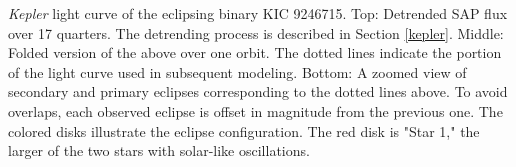 \label{fig:keplerfig} \emph{Kepler} light curve of the eclipsing binary KIC 9246715. Top: Detrended SAP flux over 17 quarters. The detrending process is described in Section \ref{kepler}. Middle: Folded version of the above over one orbit. The dotted lines indicate the portion of the light curve used in subsequent modeling. Bottom: A zoomed view of secondary and primary eclipses corresponding to the dotted lines above. To avoid overlaps, each observed eclipse is offset in magnitude from the previous one. The colored disks illustrate the eclipse configuration. The red disk is "Star 1," the larger of the two stars with solar-like oscillations.